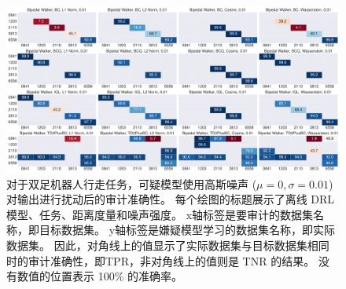 \begin{figure}[!ht]
    \includegraphics[width=\hsize]{figure/orl_auditor/overall_sac_bipedalwalker_20230201161034943.pdf}
    \caption{
    对于双足机器人行走任务，可疑模型使用高斯噪声 ($\mu=0, \sigma=0.01$) 对输出进行扰动后的审计准确性。
    每个绘图的标题展示了离线 DRL 模型、任务、距离度量和噪声强度。
    x轴标签是要审计的数据集名称，即目标数据集。
    y轴标签是嫌疑模型学习的数据集名称，即实际数据集。
    因此，对角线上的值显示了实际数据集与目标数据集相同时的审计准确性，即TPR，非对角线上的值则是 TNR 的结果。
    没有数值的位置表示 100\% 的准确率。
    }
    \label{fig:robustness 0.01 on bipedalwalker}
    \end{figure}
    
